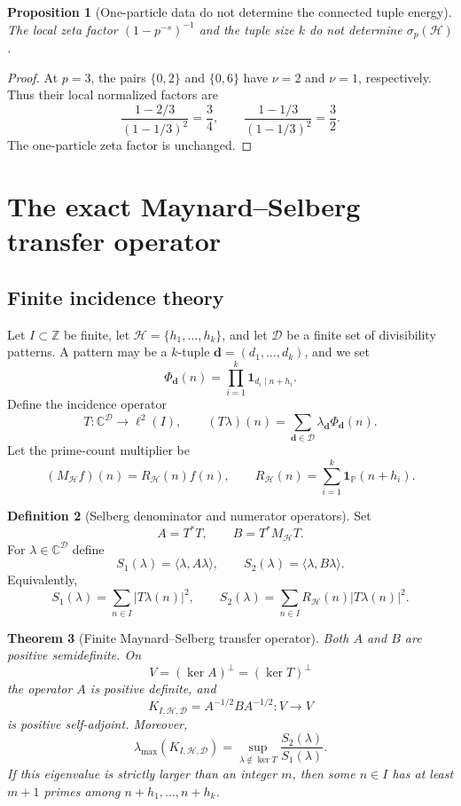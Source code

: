 \documentclass[11pt]{article}
\newtheorem{theorem}{Theorem}[section]
\newtheorem{proposition}[theorem]{Proposition}
\theoremstyle{definition}
\newtheorem{definition}[theorem]{Definition}
\theoremstyle{remark}
\newcommand{\ZZ}{\mathbb Z}
\newcommand{\CC}{\mathbb C}
\newcommand{\1}{\mathbf 1}
\newcommand{\cH}{\mathcal H}
\newcommand{\cD}{\mathscr D}
\begin{document}
\begin{proposition}[One-particle data do not determine the connected tuple energy]
The local zeta factor $(1-p^{-s})^{-1}$ and the tuple size $k$ do not determine $\sigma_p(\cH)$.
\end{proposition}

\begin{proof}
At $p=3$, the pairs $\{0,2\}$ and $\{0,6\}$ have $\nu=2$ and $\nu=1$, respectively.  Thus their local normalized factors are
\[
\frac{1-2/3}{(1-1/3)^2}=\frac34,
\qquad
\frac{1-1/3}{(1-1/3)^2}=\frac32.
\]
The one-particle zeta factor is unchanged.
\end{proof}

\section{The exact Maynard--Selberg transfer operator}

\subsection{Finite incidence theory}

Let $I\subset\ZZ$ be finite, let $\cH=\{h_1,\ldots,h_k\}$, and let $\cD$ be a finite set of divisibility patterns.  A pattern may be a $k$-tuple $\mathbf d=(d_1,\ldots,d_k)$, and we set
\[
\Phi_{\mathbf d}(n)=\prod_{i=1}^k\1_{d_i\mid n+h_i}.
\]
Define the incidence operator
\[
T:\CC^{\cD}\longrightarrow\ell^2(I),
\qquad
(T\lambda)(n)=\sum_{\mathbf d\in\cD}\lambda_{\mathbf d}\Phi_{\mathbf d}(n).
\]
Let the prime-count multiplier be
\[
(M_{\cH}f)(n)=R_{\cH}(n)f(n),
\qquad
R_{\cH}(n)=\sum_{i=1}^k\1_{\mathbb P}(n+h_i).
\]

\begin{definition}[Selberg denominator and numerator operators]
Set
\[
A=T^*T,
\qquad
B=T^*M_{\cH}T.
\]
For $\lambda\in\CC^{\cD}$ define
\[
S_1(\lambda)=\langle\lambda,A\lambda\rangle,
\qquad
S_2(\lambda)=\langle\lambda,B\lambda\rangle.
\]
Equivalently,
\[
S_1(\lambda)=\sum_{n\in I}|T\lambda(n)|^2,
\qquad
S_2(\lambda)=\sum_{n\in I}R_{\cH}(n)|T\lambda(n)|^2.
\]
\end{definition}

\begin{theorem}[Finite Maynard--Selberg transfer operator]
Both $A$ and $B$ are positive semidefinite.  On
\[
V=(\ker A)^\perp=(\ker T)^\perp
\]
the operator $A$ is positive definite, and
\[
K_{I,\cH,\cD}=A^{-1/2}BA^{-1/2}:V\to V
\]
is positive self-adjoint.  Moreover,
\[
\lambda_{\max}(K_{I,\cH,\cD})
=
\sup_{\lambda\notin\ker T}\frac{S_2(\lambda)}{S_1(\lambda)}.
\]
If this eigenvalue is strictly larger than an integer $m$, then some $n\in I$ has at least $m+1$ primes among $n+h_1,\ldots,n+h_k$.
\end{theorem}
\end{document}

